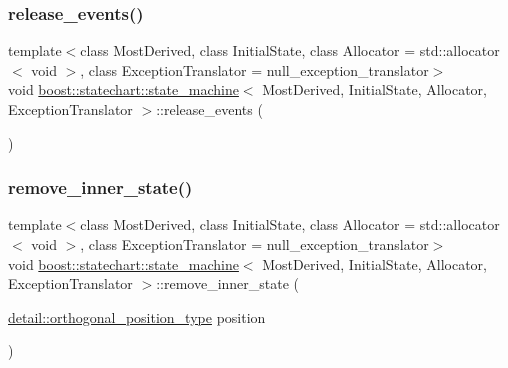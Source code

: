 \mbox{\label{classboost_1_1statechart_1_1state__machine_ac1526a82bacd6c9e9b3d6bb5001809a9}} 
\subsubsection{\texorpdfstring{release\+\_\+events()}{release\_events()}}
{\footnotesize\ttfamily template$<$class Most\+Derived, class Initial\+State, class Allocator = std\+::allocator$<$ void $>$, class Exception\+Translator = null\+\_\+exception\+\_\+translator$>$ \\
void \mbox{\hyperlink{classboost_1_1statechart_1_1state__machine}{boost\+::statechart\+::state\+\_\+machine}}$<$ Most\+Derived, Initial\+State, Allocator, Exception\+Translator $>$\+::release\+\_\+events (\begin{DoxyParamCaption}{ }\end{DoxyParamCaption})\hspace{0.3cm}{\ttfamily [inline]}}

\mbox{\label{classboost_1_1statechart_1_1state__machine_a3d848420d633249edb93d984e2bd8bb4}} 
\subsubsection{\texorpdfstring{remove\+\_\+inner\+\_\+state()}{remove\_inner\_state()}}
{\footnotesize\ttfamily template$<$class Most\+Derived, class Initial\+State, class Allocator = std\+::allocator$<$ void $>$, class Exception\+Translator = null\+\_\+exception\+\_\+translator$>$ \\
void \mbox{\hyperlink{classboost_1_1statechart_1_1state__machine}{boost\+::statechart\+::state\+\_\+machine}}$<$ Most\+Derived, Initial\+State, Allocator, Exception\+Translator $>$\+::remove\+\_\+inner\+\_\+state (\begin{DoxyParamCaption}\item[{\mbox{\hyperlink{namespaceboost_1_1statechart_1_1detail_a3bedea0b807a16fa222733417183d2c9}{detail\+::orthogonal\+\_\+position\+\_\+type}}}]{position }\end{DoxyParamCaption})\hspace{0.3cm}{\ttfamily [inline]}}

